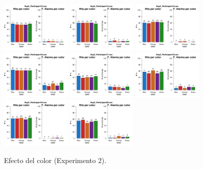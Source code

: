 \begin{figure}[th]
\includegraphics[width=0.30\textwidth]{Figures/Color_Exp2_P13} \includegraphics[width=0.30\textwidth]{Figures/Color_Exp2_P14} \includegraphics[width=0.30\textwidth]{Figures/Color_Exp2_P15}
\includegraphics[width=0.30\textwidth]{Figures/Color_Exp2_P16} \includegraphics[width=0.30\textwidth]{Figures/Color_Exp2_P17} \includegraphics[width=0.30\textwidth]{Figures/Color_Exp2_P18}
\includegraphics[width=0.30\textwidth]{Figures/Color_Exp2_P19} \includegraphics[width=0.30\textwidth]{Figures/Color_Exp2_P20} 
\caption[Color_Exp2]{Efecto del color (Experimento 2).}
\label{fig:Color_E2}
\end{figure}

